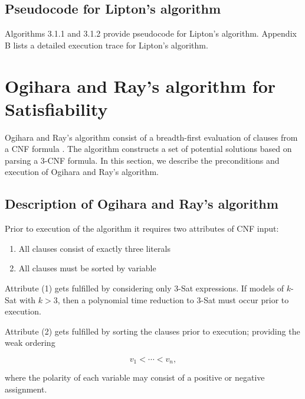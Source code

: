 	\subsection{Pseudocode for Lipton's algorithm}
	
Algorithms 3.1.1 and 3.1.2 provide pseudocode for Lipton's algorithm.  Appendix B lists a detailed execution trace for Lipton's algorithm.
	
	

	
\section{Ogihara and Ray's algorithm for {\sc Satisfiability}}


Ogihara and Ray's algorithm consist of a breadth-first evaluation of clauses from a CNF formula \cite{Ogihara:1996:BFS:898228,Ogihara97dna-basedparallel}.  The algorithm constructs a set of potential solutions based on parsing a 3-CNF formula.  In this section, we describe the preconditions and execution of Ogihara and Ray's algorithm.

\subsection{Description of Ogihara and Ray's algorithm}
		
Prior to execution of the algorithm it requires two attributes of CNF input:

\begin{enumerate}
\item All clauses consist of exactly three literals
\item All clauses must be sorted by variable
\end{enumerate}

Attribute (1) gets fulfilled by considering only $3$-{\sc Sat} expressions.  If models of $k$-{\sc Sat} with $k > 3$, then a polynomial time reduction to $3$-{\sc Sat} must occur prior to execution.

Attribute (2) gets fulfilled by sorting the clauses prior to execution; providing the weak ordering

\[
v_1 < \cdots < v_n,
\]

where the polarity of each variable may consist of a positive or negative assignment.

